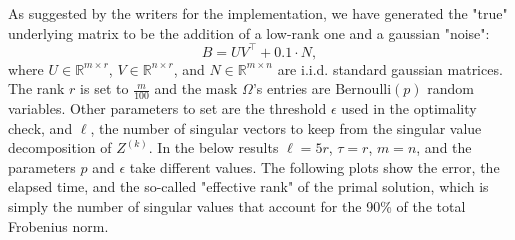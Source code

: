 \documentclass[12pt]{article}
\begin{document}
As suggested by the writers for the implementation, we have generated the "true" underlying matrix to be the addition of a low-rank one and a gaussian "noise":
\begin{equation*}
    B = UV^\top + 0.1 \cdot N,
\end{equation*}
where $U \in \mathbb{R}^{m \times r}$, $V \in \mathbb{R}^{n \times r}$, and $N \in \mathbb{R}^{m \times n}$ are i.i.d. standard gaussian matrices. The rank $r$ is set to $\frac{m}{100}$ and the mask $\Omega$'s entries are $\mathrm{Bernoulli}(p)$ random variables. Other parameters to set are the threshold $\epsilon$ used in the optimality check, and $\ell$, the number of singular vectors to keep from the singular value decomposition of $Z^{(k)}$. In the below results $\ell = 5r$, $\tau = r$, $m = n$, and the parameters $p$ and $\epsilon$ take different values. The following plots show the error, the elapsed time, and the so-called "effective rank" of the primal solution, which is simply the number of singular values that account for the 90\% of the total Frobenius norm.
\end{document}
